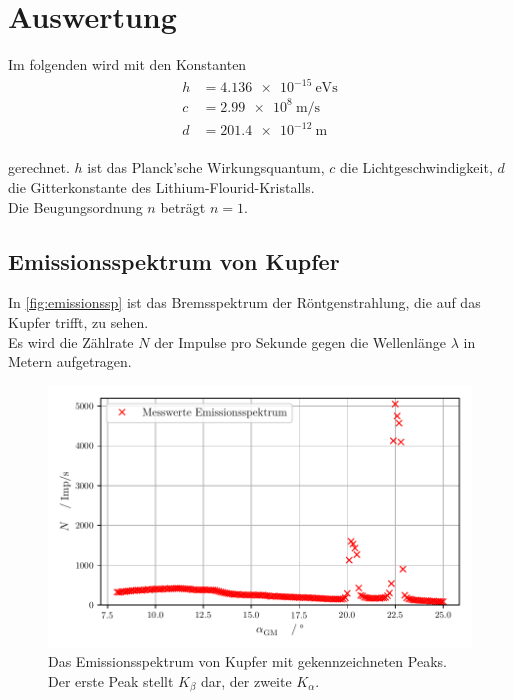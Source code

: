 \section{Auswertung}
\label{sec:Auswertung}

Im folgenden wird mit den Konstanten 
\begin{align*}
  h &= \SI{4,136e-15}{\electronvolt\second}\\
  c &= \SI{2,99e8}{\meter\per\second}\\
  d &= \SI{201,4e-12}{\meter}\\
\end{align*}

\noindent gerechnet. $h$ ist das Planck'sche Wirkungsquantum, $c$ die Lichtgeschwindigkeit,
$d$ die Gitterkonstante des Lithium-Flourid-Kristalls.\\
Die Beugungsordnung $n$ beträgt $n = 1$.




\subsection{Emissionsspektrum von Kupfer}
\label{subsec:spektrumCU}


In \autoref{fig:emissionssp} ist das Bremsspektrum der Röntgenstrahlung, die auf das Kupfer trifft, zu sehen.\\
Es wird die Zählrate $N$ der Impulse pro Sekunde gegen die Wellenlänge $\lambda$ in Metern aufgetragen.\\

\begin{figure}[H]
  \centering
  \includegraphics{build/emissionsspektrum.pdf}
  \caption{Das Emissionsspektrum von Kupfer mit gekennzeichneten Peaks. Der erste Peak stellt $K_{\beta}$ dar, der zweite $K_{\alpha}$.}
  \label{fig:emissionssp}
\end{figure}

